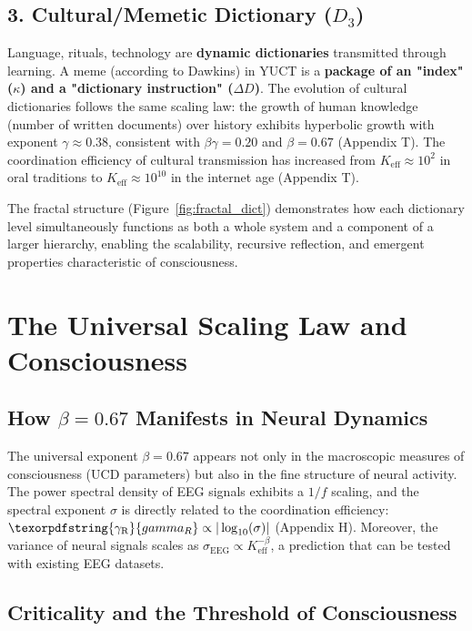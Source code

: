 \documentclass[12pt,a4paper]{article}
\DeclareRobustCommand{\gaR}{\texorpdfstring{\ensuremath{\gamma_{\mathrm{R}}}}{gamma_R}}
\newcommand{\eff}{\mathrm{eff}}
\newcommand{\Ke}{K_{\eff}}
\begin{document}
	\subsection{3. Cultural/Memetic Dictionary ($D_3$)}
	
	Language, rituals, technology are \textbf{dynamic dictionaries} transmitted through learning. A meme (according to Dawkins) in YUCT is a \textbf{package of an "index" ($\kappa$) and a "dictionary instruction" ($\Delta D$)}. The evolution of cultural dictionaries follows the same scaling law: the growth of human knowledge (number of written documents) over history exhibits hyperbolic growth with exponent $\gamma \approx 0.38$, consistent with $\beta\gamma = 0.20$ and $\beta = 0.67$ (Appendix T). The coordination efficiency of cultural transmission has increased from $\Ke \approx 10^2$ in oral traditions to $\Ke \approx 10^{10}$ in the internet age (Appendix T).
	
	The fractal structure (Figure~\ref{fig:fractal_dict}) demonstrates how each dictionary level simultaneously functions as both a whole system and a component of a larger hierarchy, enabling the scalability, recursive reflection, and emergent properties characteristic of consciousness.
	
	\section{The Universal Scaling Law and Consciousness}
	
	\subsection{How $\beta = 0.67$ Manifests in Neural Dynamics}
	
	The universal exponent $\beta = 0.67$ appears not only in the macroscopic measures of consciousness (UCD parameters) but also in the fine structure of neural activity. The power spectral density of EEG signals exhibits a $1/f$ scaling, and the spectral exponent $\sigma$ is directly related to the coordination efficiency: $\gaR \propto |\log_{10}(\sigma)|$ (Appendix H). Moreover, the variance of neural signals scales as $\sigma_{\text{EEG}} \propto \Ke^{-\beta}$, a prediction that can be tested with existing EEG datasets.
	
	\subsection{Criticality and the Threshold of Consciousness}
	
\end{document}
